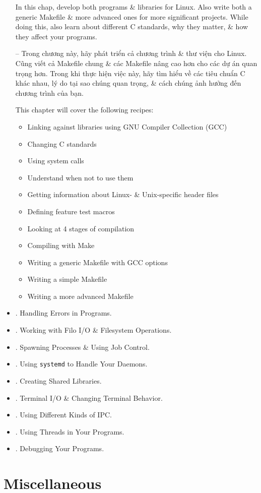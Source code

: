 \documentclass{article}
\begin{document}
\begin{itemize}
    In this chap, develop both programs \& libraries for Linux. Also write both a generic Makefile \& more advanced ones for more significant projects. While doing this, also learn about different C standards, why they matter, \& how they affect your programs.
    
    -- Trong chương này, hãy phát triển cả chương trình \& thư viện cho Linux. Cũng viết cả Makefile chung \& các Makefile nâng cao hơn cho các dự án quan trọng hơn. Trong khi thực hiện việc này, hãy tìm hiểu về các tiêu chuẩn C khác nhau, lý do tại sao chúng quan trọng, \& cách chúng ảnh hưởng đến chương trình của bạn.
    
    This chapter will cover the following recipes:
    \begin{itemize}
        \item Linking against libraries using GNU Compiler Collection (GCC)
        \item Changing C standards
        \item Using system calls
        \item Understand when not to use them
        \item Getting information about Linux- \& Unix-specific header files
        \item Defining feature test macros
        \item Looking at 4 stages of compilation
        \item Compiling with Make
        \item Writing a generic Makefile with GCC options
        \item Writing a simple Makefile
        \item Writing a more advanced Makefile
    \end{itemize}
    \item {. Handling Errors in Programs.}
    \item {. Working with Filo I/O \& Filesystem Operations.}
    \item {. Spawning Processes \& Using Job Control.}
    \item {. Using {\tt systemd} to Handle Your Daemons.}
    \item {. Creating Shared Libraries.}
    \item {. Terminal I/O \& Changing Terminal Behavior.}
    \item {. Using Different Kinds of IPC.}
    \item {. Using Threads in Your Programs.}
    \item {. Debugging Your Programs.}
\end{itemize}


\section{Miscellaneous}


\printbibliography[heading=bibintoc]
    
\end{document}
